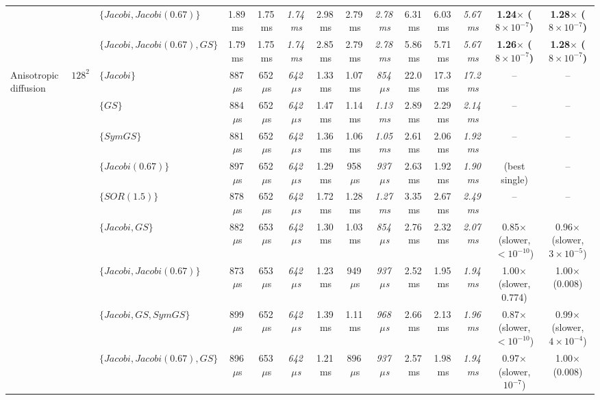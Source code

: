 {\begin{tabular}{lllccccccccccc}
 &  & $\{Jacobi, Jacobi (0.67)\}$ & 1.89\,ms & 1.75\,ms & \textit{1.74\,ms} & 2.98\,ms & 2.79\,ms & \textit{2.78\,ms} & 6.31\,ms & 6.03\,ms & \textit{5.67\,ms} & \textbf{1.24$\times$ ($8\times10^{-7}$)} & \textbf{1.28$\times$ ($8\times10^{-7}$)} \\
 &  & $\{Jacobi, Jacobi (0.67), GS\}$ & 1.79\,ms & 1.75\,ms & \textit{1.74\,ms} & 2.85\,ms & 2.79\,ms & \textit{2.78\,ms} & 5.86\,ms & 5.71\,ms & \textit{5.67\,ms} & \textbf{1.26$\times$ ($8\times10^{-7}$)} & \textbf{1.28$\times$ ($8\times10^{-7}$)} \\
\midrule
Anisotropic diffusion & $128^2$ & $\{Jacobi\}$ & 887\,$\mu$s & 652\,$\mu$s & \textit{642\,$\mu$s} & 1.33\,ms & 1.07\,ms & \textit{854\,$\mu$s} & 22.0\,ms & 17.3\,ms & \textit{17.2\,ms} & -- & -- \\
 &  & $\{GS\}$ & 884\,$\mu$s & 652\,$\mu$s & \textit{642\,$\mu$s} & 1.47\,ms & 1.14\,ms & \textit{1.13\,ms} & 2.89\,ms & 2.29\,ms & \textit{2.14\,ms} & -- & -- \\
 &  & $\{SymGS\}$ & 881\,$\mu$s & 652\,$\mu$s & \textit{642\,$\mu$s} & 1.36\,ms & 1.06\,ms & \textit{1.05\,ms} & 2.61\,ms & 2.06\,ms & \textit{1.92\,ms} & -- & -- \\
 &  & $\{Jacobi (0.67)\}$ & 897\,$\mu$s & 652\,$\mu$s & \textit{642\,$\mu$s} & 1.29\,ms & 958\,$\mu$s & \textit{937\,$\mu$s} & 2.63\,ms & 1.92\,ms & \textit{1.90\,ms} & (best single) & -- \\
 &  & $\{SOR (1.5)\}$ & 878\,$\mu$s & 652\,$\mu$s & \textit{642\,$\mu$s} & 1.72\,ms & 1.28\,ms & \textit{1.27\,ms} & 3.35\,ms & 2.67\,ms & \textit{2.49\,ms} & -- & -- \\
 &  & $\{Jacobi, GS\}$ & 882\,$\mu$s & 653\,$\mu$s & \textit{642\,$\mu$s} & 1.30\,ms & 1.03\,ms & \textit{854\,$\mu$s} & 2.76\,ms & 2.32\,ms & \textit{2.07\,ms} & 0.85$\times$ (slower, $<10^{-10}$) & 0.96$\times$ (slower, $3\times10^{-5}$) \\
 &  & $\{Jacobi, Jacobi (0.67)\}$ & 873\,$\mu$s & 653\,$\mu$s & \textit{642\,$\mu$s} & 1.23\,ms & 949\,$\mu$s & \textit{937\,$\mu$s} & 2.52\,ms & 1.95\,ms & \textit{1.94\,ms} & 1.00$\times$ (slower, 0.774) & 1.00$\times$ (0.008) \\
 &  & $\{Jacobi, GS, SymGS\}$ & 899\,$\mu$s & 652\,$\mu$s & \textit{642\,$\mu$s} & 1.39\,ms & 1.11\,ms & \textit{968\,$\mu$s} & 2.66\,ms & 2.13\,ms & \textit{1.96\,ms} & 0.87$\times$ (slower, $<10^{-10}$) & 0.99$\times$ (slower, $4\times10^{-4}$) \\
 &  & $\{Jacobi, Jacobi (0.67), GS\}$ & 896\,$\mu$s & 653\,$\mu$s & \textit{642\,$\mu$s} & 1.21\,ms & 896\,$\mu$s & \textit{937\,$\mu$s} & 2.57\,ms & 1.98\,ms & \textit{1.94\,ms} & 0.97$\times$ (slower, $10^{-7}$) & 1.00$\times$ (0.008) \\

\end{tabular}}

